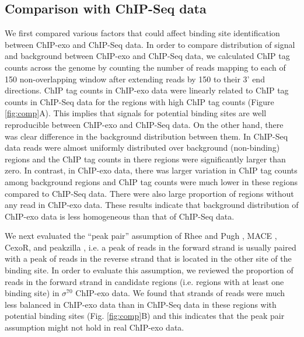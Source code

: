 \documentclass{bmcart}\usepackage[]{graphicx}\usepackage[]{color}
\begin{document}
\subsection{Comparison with ChIP-Seq data}
\label{sec:comp}



We first compared various factors that could affect binding site
identification between ChIP-exo and ChIP-Seq data. In order to compare
distribution of signal and background between ChIP-exo and ChIP-Seq
data, we calculated ChIP tag counts across the genome by counting the
number of reads mapping to each of 150 non-overlapping
window after extending reads by 150 to their 3' end
directions. ChIP tag counts in ChIP-exo data were linearly related to
ChIP tag counts in ChIP-Seq data for the regions with high ChIP tag
counts (Figure \ref{fig:comp}A). This implies that signals for
potential binding sites are well reproducible between ChIP-exo and
ChIP-Seq data. On the other hand, there was clear difference in the
background distribution between them. In ChIP-Seq data reads were
almost uniformly distributed over background (non-binding) regions and
the ChIP tag counts in there regions were significantly larger than
zero. In contrast, in ChIP-exo data, there was larger variation in
ChIP tag counts among background regions and ChIP tag counts were much
lower in these regions compared to ChIP-Seq data. There were also
large proportion of regions without any read in ChIP-exo data. These
results indicate that background distribution of ChIP-exo data is less
homogeneous than that of ChIP-Seq data.

We next evaluated the ``peak pair'' assumption of Rhee and Pugh
\cite{exo1}, MACE \cite{mace}, CexoR, \cite{cexor} and peakzilla
\cite{peakzilla}, i.e. a peak of reads in the forward strand is
usually paired with a peak of reads in the reverse strand that is
located in the other site of the binding site. In order to evaluate
this assumption, we reviewed the proportion of reads in the forward
strand in candidate regions (i.e. regions with at least one binding
site) in $\sigma^{70}$ ChIP-exo data. We found that strands of reads
were much less balanced in ChIP-exo data than in ChIP-Seq data in
these regions with potential binding sites (Fig. \ref{fig:comp}B) and
this indicates that the peak pair assumption might not hold in real
ChIP-exo data.

\end{document}
